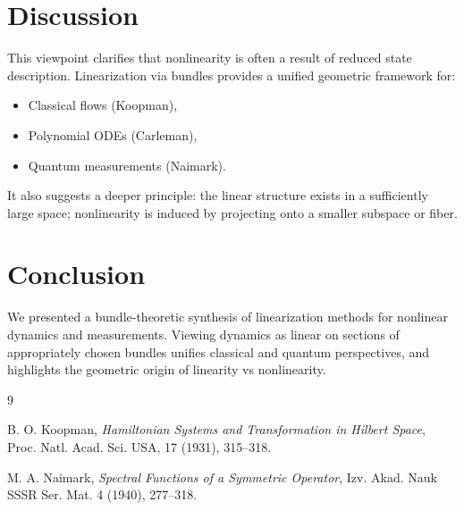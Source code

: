 \documentclass[12pt]{article}
\theoremstyle{definition}
\theoremstyle{plain}
\begin{document}
\section{Discussion}

This viewpoint clarifies that nonlinearity is often a result of reduced state description. Linearization via bundles provides a unified geometric framework for:

\begin{itemize}
    \item Classical flows (Koopman),
    \item Polynomial ODEs (Carleman),
    \item Quantum measurements (Naimark).
\end{itemize}

It also suggests a deeper principle: the linear structure exists in a sufficiently large space; nonlinearity is induced by projecting onto a smaller subspace or fiber.

\section{Conclusion}

We presented a bundle-theoretic synthesis of linearization methods for nonlinear dynamics and measurements. Viewing dynamics as linear on sections of appropriately chosen bundles unifies classical and quantum perspectives, and highlights the geometric origin of linearity vs nonlinearity.

\begin{thebibliography}{9}

B. O. Koopman, \emph{Hamiltonian Systems and Transformation in Hilbert Space}, Proc. Natl. Acad. Sci. USA, 17 (1931), 315--318.

M. A. Naimark, \emph{Spectral Functions of a Symmetric Operator}, Izv. Akad. Nauk SSSR Ser. Mat. 4 (1940), 277–318.

\end{thebibliography}
\end{document}
